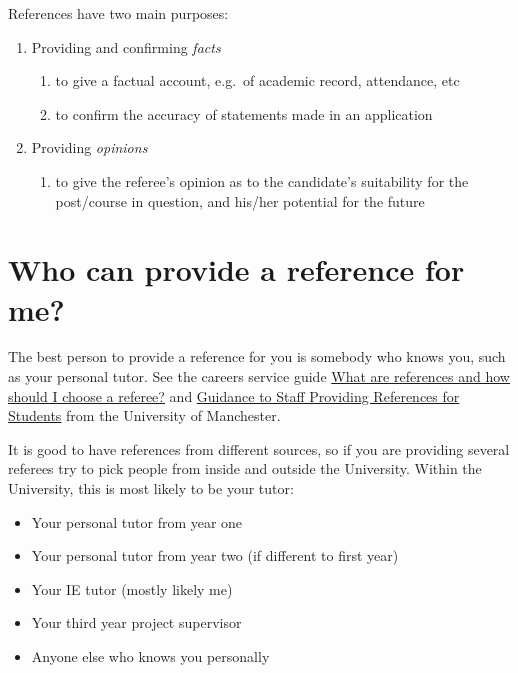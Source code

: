 \documentclass[
  12pt,
]{book}
\providecommand{\tightlist}{%
  \setlength{\itemsep}{0pt}\setlength{\parskip}{0pt}}
\begin{document}
References have two main purposes:

\begin{enumerate}
\def\labelenumi{\arabic{enumi}.}
\tightlist
\item
  Providing and confirming \emph{facts}

  \begin{enumerate}
  \def\labelenumii{\roman{enumii}.}
  \tightlist
  \item
    to give a factual account, e.g.~of academic record, attendance, etc
  \item
    to confirm the accuracy of statements made in an application
  \end{enumerate}
\item
  Providing \emph{opinions}

  \begin{enumerate}
  \def\labelenumii{\roman{enumii}.}
  \tightlist
  \item
    to give the referee's opinion as to the candidate's suitability for the post/course in
    question, and his/her potential for the future
  \end{enumerate}
\end{enumerate}

\hypertarget{who-can-provide-a-reference-for-me}{%
\section{Who can provide a reference for me?}\label{who-can-provide-a-reference-for-me}}

The best person to provide a reference for you is somebody who knows you, such as your personal tutor. See the careers service guide \href{http://www.careers.manchester.ac.uk/applicationsinterviews/faqs/references}{What are references and how should I choose a referee?} and \href{http://documents.manchester.ac.uk/display.aspx?DocID=1921}{Guidance to Staff Providing References for Students} from the University of Manchester.

It is good to have references from different sources, so if you are providing several referees try to pick people from inside and outside the University. Within the University, this is most likely to be your tutor:

\begin{itemize}
\tightlist
\item
  Your personal tutor from year one
\item
  Your personal tutor from year two (if different to first year)
\item
  Your IE tutor (mostly likely me)
\item
  Your third year project supervisor
\item
  Anyone else who knows you personally
\end{itemize}
\end{document}
